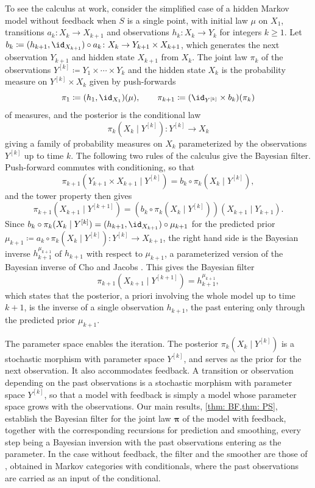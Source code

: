 \documentclass[12pt,reqno]{amsart}%
\theoremstyle{plain}
\theoremstyle{definition}
\def\bspi{\boldsymbol{\pi}}
\begin{document}
To see the calculus at work, consider the simplified case of a hidden Markov model without feedback
when $S$ is a single point, with initial law $\mu$ on $X_1$, transitions $a_k\colon X_k\rightarrow X_{k+1}$ and observations $h_k\colon X_k\rightarrow Y_k$ for integers $k\geq 1$.
Let $b_k\coloneqq(h_{k+1},\id_{X_{k+1}})\circ a_k\colon X_k\rightarrow Y_{k+1}\times X_{k+1}$,
which generates the next observation $Y_{k+1}$ and hidden state $X_{k+1}$ from $X_k$.
The joint law $\pi_k$ of the observations $Y^{[k]}\coloneqq Y_1\times\cdots\times Y_k$ and the hidden state $X_k$ 
is the probability measure on $Y^{[k]}\times X_k$ given by push-forwards
\[
	\pi_1\coloneqq(h_1,\id_{X_1})(\mu),\qquad \pi_{k+1}\coloneqq(\id_{Y^{[k]}}\times b_k)(\pi_k)
\]
of measures, and the posterior is the conditional law
\[
	\pi_k(X_k\mid Y^{[k]})\colon Y^{[k]}\rightarrow X_k
\]
giving a family of probability measures on $X_k$
parameterized by the observations $Y^{[k]}$ up to time $k$.
The following two rules of the calculus give the Bayesian filter.
Push-forward commutes with conditioning, so that
\[
	\pi_{k+1}(Y_{k+1}\times X_{k+1}\mid Y^{[k]})=b_k\circ\pi_k(X_k\mid Y^{[k]}),
\]
and the tower property then gives
\[
	\pi_{k+1}(X_{k+1}\mid Y^{[k+1]})=(b_k\circ\pi_k(X_k\mid Y^{[k]}))(X_{k+1}\mid Y_{k+1}).
\]
Since $b_k\circ\pi_k(X_k\mid Y^{[k]})=(h_{k+1},\id_{X_{k+1}})\circ\mu_{k+1}$
for the predicted prior $\mu_{k+1}\coloneqq a_k\circ\pi_k(X_k\mid Y^{[k]})\colon Y^{[k]}\rightarrow X_{k+1}$,
the right hand side is the Bayesian inverse $h_{k+1}^{\mu_{k+1}}$ of $h_{k+1}$ with respect to $\mu_{k+1}$,
a parameterized version of the Bayesian inverse of Cho and Jacobs \cite{CJ19}.
This gives the Bayesian filter
\[
	\pi_{k+1}(X_{k+1}\mid Y^{[k+1]})=h_{k+1}^{\mu_{k+1}},
\]
which states that the posterior, a priori involving the whole model up to time $k+1$,
is the inverse of a single observation $h_{k+1}$, the past entering only through the predicted prior $\mu_{k+1}$.

The parameter space enables the iteration.
The posterior $\pi_k(X_k\mid Y^{[k]})$ is a stochastic morphism with parameter space $Y^{[k]}$,
and serves as the prior for the next observation.
It also accommodates feedback.
A transition or observation depending on the past observations is a stochastic morphism with parameter space $Y^{[k]}$,
so that a model with feedback is simply a model whose parameter space grows with the observations.
Our main results, \cref{thm: BF,thm: PS}, establish the Bayesian filter for the joint law $\bspi$ of the model with feedback,
together with the corresponding recursions for prediction and smoothing,
every step being a Bayesian inversion with the past observations entering as the parameter.
In the case without feedback, the filter and the smoother are those of \cite{F25},
obtained in Markov categories with conditionals, where the past observations are carried as an input of the conditional.
\end{document}
